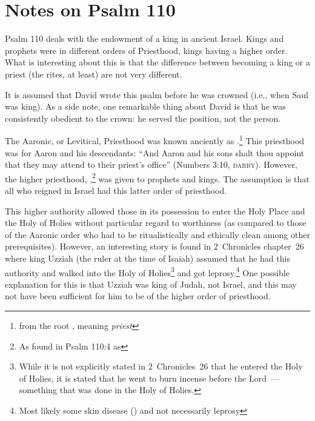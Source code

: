 \chapter{Notes on Psalm 110}\label{app:psalm-110}
Psalm 110 deals with the endowment of a king in ancient Israel. Kings and prophets were in different orders of Priesthood, kings having a higher order. What is interesting about this is that the difference between becoming a king or a priest (the rites, at least) are not very different.

It is assumed that David wrote this psalm before he was crowned (i.e., when Saul was king). As a side note, one remarkable thing about David is that he was consistently obedient to the crown: he served the position, not the person.

The Aaronic, or Levitical, Priesthood was known anciently as .\footnote{from the root , meaning \emph{priest}} This priesthood was for Aaron and his descendants: ``And Aaron and his sons shalt thou appoint that they may attend to their priest's office'' (Numbers 3:10, \textsc{darby}). However, the higher priesthood, ,\footnote{As found in Psalm 110:4 as } was given to prophets and kings. The assumption is that all who reigned in Israel had this latter order of priesthood.

This higher authority allowed those in its possession to enter the Holy Place and the Holy of Holies without particular regard to worthiness (as compared to those of the Aaronic order who had to be ritualistically and ethically clean among other prerequisites). However, an interesting story is found in 2~Chronicles chapter~26 where king Uzziah (the ruler at the time of Isaiah) assumed that he had this authority and walked into the Holy of Holies\footnote{While it is not explicitly stated in 2~Chronicles~26 that he entered the Holy of Holies, it is stated that he went to burn incense before the Lord~--- something that was done in the Holy of Holies.} and got leprosy.\footnote{Most likely some skin disease () and not necessarily leprosy} One possible explanation for this is that Uzziah was king of Judah, not Israel, and this may not have been sufficient for him to be of the higher order of priesthood.
